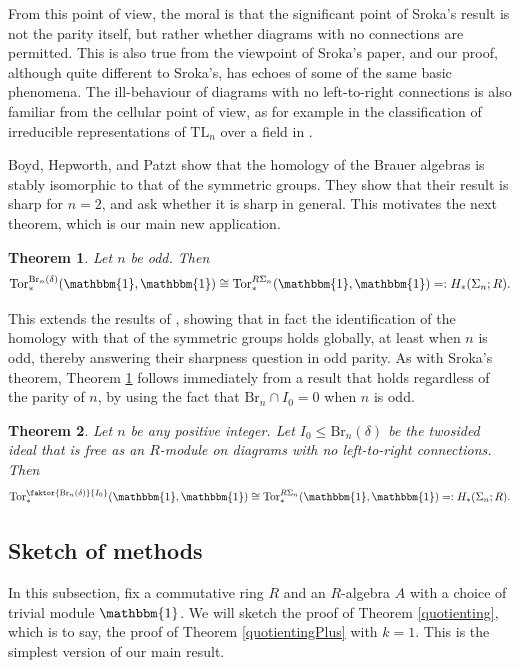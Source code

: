 \documentclass[12pt]{amsart}
\theoremstyle{plain}
\newtheorem{theorem}{Theorem}[section]
\theoremstyle{definition} \newtheorem{definition}[theorem]{Definition}
\theoremstyle{plain}
\theoremstyle{plain} \newtheorem{proposition}[theorem]{Proposition}
\theoremstyle{plain} \newtheorem{conjecture}[theorem]{Conjecture}
\theoremstyle{plain} \newtheorem{corollary}[theorem]{Corollary}
\theoremstyle{remark} \newtheorem{claim}[theorem]{Claim}
\theoremstyle{remark} \newtheorem{remark}[theorem]{Remark}
\theoremstyle{remark} \newtheorem{example}[theorem]{Example}
\theoremstyle{remark} \newtheorem{comment}[theorem]{Comment}
\theoremstyle{definition} \newtheorem{question}[theorem]{Question}
\renewcommand{\t}{\mathbbm{1}}
\newcommand{\Tor}{\mathrm{Tor}}
\newcommand{\Brauer}{\mathrm{Br}}
\newcommand{\TL}{\mathrm{TL}}
\begin{document}
From this point of view, the moral is that the significant point of Sroka's result is not the parity itself, but rather whether diagrams with no connections are permitted. This is also true from the viewpoint of Sroka's paper, and our proof, although quite different to Sroka's, has echoes of some of the same basic phenomena. The ill-behaviour of diagrams with no left-to-right connections is also familiar from the cellular point of view, as for example in the classification of irreducible representations of $\TL_n$ over a field in \cite[Corollary 6.8]{GrahamLehrer}.

Boyd, Hepworth, and Patzt \cite{BHP} show that the homology of the Brauer algebras is stably isomorphic to that of the symmetric groups. They show that their result is sharp for $n=2$, and ask whether it is sharp in general. This motivates the next theorem, which is our main new application.

\begin{theorem} \label{BrauerSroka} Let $n$ be odd. Then $$\Tor^{\Brauer_n(\delta)}_*(\t,\t) \cong \Tor_*^{R \Sigma_n}(\t,\t) =: H_*(\Sigma_n ; R).$$ \end{theorem}

This extends the results of \cite{BHP}, showing that in fact the identification of the homology with that of the symmetric groups holds globally, at least when $n$ is odd, thereby answering their sharpness question in odd parity. As with Sroka's theorem, Theorem \ref{BrauerSroka} follows immediately from a result that holds regardless of the parity of $n$, by using the fact that $\Brauer_n \cap I_0=0$ when $n$ is odd.

\begin{theorem} \label{generalisedBrauerSroka} Let $n$ be any positive integer. Let $I_0 \leq \Brauer_n(\delta)$ be the twosided ideal that is free as an $R$-module on diagrams with no left-to-right connections. Then $$\Tor^{\faktor{\Brauer_n(\delta)}{I_0}}_*(\t,\t) \cong \Tor_*^{R \Sigma_n}(\t,\t) =: H_*(\Sigma_n ; R).$$ \end{theorem}

\subsection{Sketch of methods}

In this subsection, fix a commutative ring $R$ and an $R$-algebra $A$ with a choice of trivial module $\t$. We will sketch the proof of Theorem \ref{quotienting}, which is to say, the proof of Theorem \ref{quotientingPlus} with $k=1$. This is the simplest version of our main result.
\end{document}
